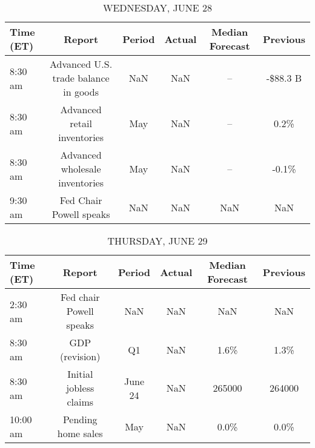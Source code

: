 \documentclass{article}%
\begin{document}
\begin{table}[htbp]%
\caption{WEDNESDAY, JUNE 28}%
\centering%
\begin{adjustbox}{width=1\textwidth}%
\begin{tabular}{lccccc}
\toprule
Time (ET) &                               Report & Period & Actual & Median Forecast & Previous \\
\midrule
  8:30 am & Advanced U.S. trade balance in goods &    NaN &    NaN &              -- & -\$88.3 B \\
  8:30 am &          Advanced retail inventories &    May &    NaN &              -- &     0.2\% \\
  8:30 am &       Advanced wholesale inventories &    May &    NaN &              -- &    -0.1\% \\
  9:30 am &              Fed Chair Powell speaks &    NaN &    NaN &             NaN &      NaN \\
\bottomrule
\end{tabular}
%
\end{adjustbox}%
\end{table}

%


\begin{table}[htbp]%
\caption{THURSDAY, JUNE 29}%
\centering%
\begin{adjustbox}{width=1\textwidth}%
\begin{tabular}{lccccc}
\toprule
Time (ET) &                  Report &  Period & Actual & Median Forecast & Previous \\
\midrule
  2:30 am & Fed chair Powell speaks &     NaN &    NaN &             NaN &      NaN \\
  8:30 am &          GDP (revision) &      Q1 &    NaN &            1.6\% &     1.3\% \\
  8:30 am &  Initial jobless claims & June 24 &    NaN &          265000 &   264000 \\
 10:00 am &      Pending home sales &     May &    NaN &            0.0\% &     0.0\% \\
\bottomrule
\end{tabular}
%
\end{adjustbox}%
\end{table}

%
\end{document}
